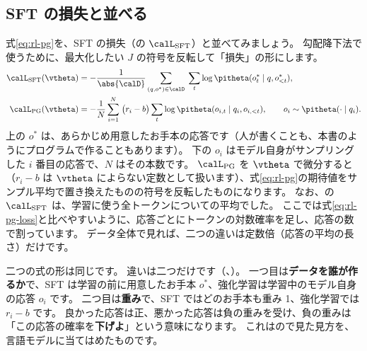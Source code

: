 \subsection{SFT の損失と並べる}

式\eqref{eq:rl-pg}を、SFT の損失（の $\calL_{\text{SFT}}$）と並べてみましょう。
勾配降下法で使うために、最大化したい $J$ の符号を反転して「損失」の形にします。
\begin{align}
\calL_{\text{SFT}}(\vtheta)&=-\frac{1}{\abs{\calD}}\sum_{(q,o^\ast)\in\calD}\;\sum_{t}\log\pitheta(o^\ast_t\mid q,o^\ast_{<t}),
\label{eq:rl-sft-loss}\\
\calL_{\text{PG}}(\vtheta)&=-\frac{1}{N}\sum_{i=1}^{N}\;\bigl(r_i-b\bigr)\sum_{t}\log\pitheta(o_{i,t}\mid q_i,o_{i,<t}),
\qquad o_i\sim\pitheta(\cdot\mid q_i).
\label{eq:rl-pg-loss}
\end{align}
上の $o^\ast$ は、あらかじめ用意したお手本の応答です（人が書くことも、本書のようにプログラムで作ることもあります）。
下の $o_i$ はモデル自身がサンプリングした $i$ 番目の応答で、$N$ はその本数です。
$\calL_{\text{PG}}$ を $\vtheta$ で微分すると（$r_i-b$ は $\vtheta$ によらない定数として扱います）、式\eqref{eq:rl-pg}の期待値をサンプル平均で置き換えたものの符号を反転したものになります。
なお、の $\calL_{\text{SFT}}$ は、学習に使う全トークンについての平均でした。
ここでは式\eqref{eq:rl-pg-loss}と比べやすいように、応答ごとにトークンの対数確率を足し、応答の数で割っています。
データ全体で見れば、二つの違いは定数倍（応答の平均の長さ）だけです。

二つの式の形は同じです。
違いは二つだけです（、）。
一つ目は\textbf{データを誰が作るか}で、SFT は学習の前に用意したお手本 $o^\ast$、強化学習は学習中のモデル自身の応答 $o_i$ です。
二つ目は\textbf{重み}で、SFT ではどのお手本も重み 1、強化学習では $r_i-b$ です。
良かった応答は正、悪かった応答は負の重みを受け、負の重みは「この応答の確率を\textbf{下げよ}」という意味になります。
これはので見た見方を、言語モデルに当てはめたものです。

